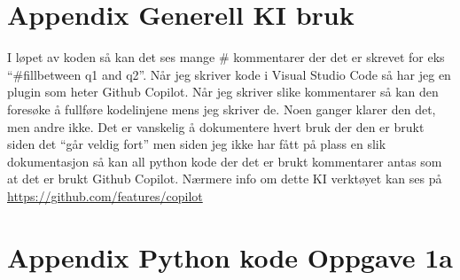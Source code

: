 \documentclass[
  12pt,
  a4paper,
  DIV=11,
  numbers=noendperiod]{scrartcl}
\begin{document}
\clearpage

\appendix

\section {Appendix Generell KI bruk}

I løpet av koden så kan det ses mange \# kommentarer der det er skrevet
for eks ``\#fillbetween q1 and q2''. Når jeg skriver kode i Visual
Studio Code så har jeg en plugin som heter Github Copilot. Når jeg
skriver slike kommentarer så kan den foresøke å fullføre kodelinjene
mens jeg skriver de. Noen ganger klarer den det, men andre ikke. Det er
vanskelig å dokumentere hvert bruk der den er brukt siden det ``går
veldig fort'' men siden jeg ikke har fått på plass en slik dokumentasjon
så kan all python kode der det er brukt kommentarer antas som at det er
brukt Github Copilot. Nærmere info om dette KI verktøyet kan ses på
\url{https://github.com/features/copilot}

\clearpage

\section {Appendix Python kode Oppgave 1a}
\end{document}
